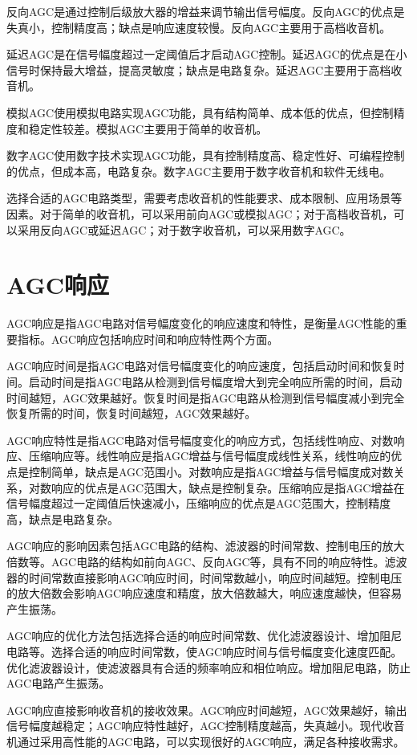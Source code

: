 \documentclass[12pt,UTF8]{ctexbook}
\begin{document}
反向AGC是通过控制后级放大器的增益来调节输出信号幅度。反向AGC的优点是失真小，控制精度高；缺点是响应速度较慢。反向AGC主要用于高档收音机。

延迟AGC是在信号幅度超过一定阈值后才启动AGC控制。延迟AGC的优点是在小信号时保持最大增益，提高灵敏度；缺点是电路复杂。延迟AGC主要用于高档收音机。

模拟AGC使用模拟电路实现AGC功能，具有结构简单、成本低的优点，但控制精度和稳定性较差。模拟AGC主要用于简单的收音机。

数字AGC使用数字技术实现AGC功能，具有控制精度高、稳定性好、可编程控制的优点，但成本高，电路复杂。数字AGC主要用于数字收音机和软件无线电。

选择合适的AGC电路类型，需要考虑收音机的性能要求、成本限制、应用场景等因素。对于简单的收音机，可以采用前向AGC或模拟AGC；对于高档收音机，可以采用反向AGC或延迟AGC；对于数字收音机，可以采用数字AGC。

\section{AGC响应}

AGC响应是指AGC电路对信号幅度变化的响应速度和特性，是衡量AGC性能的重要指标。AGC响应包括响应时间和响应特性两个方面。

AGC响应时间是指AGC电路对信号幅度变化的响应速度，包括启动时间和恢复时间。启动时间是指AGC电路从检测到信号幅度增大到完全响应所需的时间，启动时间越短，AGC效果越好。恢复时间是指AGC电路从检测到信号幅度减小到完全恢复所需的时间，恢复时间越短，AGC效果越好。

AGC响应特性是指AGC电路对信号幅度变化的响应方式，包括线性响应、对数响应、压缩响应等。线性响应是指AGC增益与信号幅度成线性关系，线性响应的优点是控制简单，缺点是AGC范围小。对数响应是指AGC增益与信号幅度成对数关系，对数响应的优点是AGC范围大，缺点是控制复杂。压缩响应是指AGC增益在信号幅度超过一定阈值后快速减小，压缩响应的优点是AGC范围大，控制精度高，缺点是电路复杂。

AGC响应的影响因素包括AGC电路的结构、滤波器的时间常数、控制电压的放大倍数等。AGC电路的结构如前向AGC、反向AGC等，具有不同的响应特性。滤波器的时间常数直接影响AGC响应时间，时间常数越小，响应时间越短。控制电压的放大倍数会影响AGC响应速度和精度，放大倍数越大，响应速度越快，但容易产生振荡。

AGC响应的优化方法包括选择合适的响应时间常数、优化滤波器设计、增加阻尼电路等。选择合适的响应时间常数，使AGC响应时间与信号幅度变化速度匹配。优化滤波器设计，使滤波器具有合适的频率响应和相位响应。增加阻尼电路，防止AGC电路产生振荡。

AGC响应直接影响收音机的接收效果。AGC响应时间越短，AGC效果越好，输出信号幅度越稳定；AGC响应特性越好，AGC控制精度越高，失真越小。现代收音机通过采用高性能的AGC电路，可以实现很好的AGC响应，满足各种接收需求。
\end{document}
